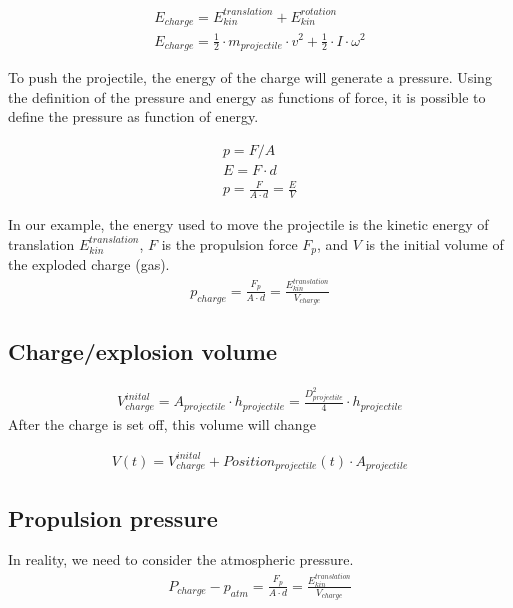 \documentclass[12pt,a4paper]{article}
\begin{document}
\begin{eqnarray}
	E_{charge} = E_{kin}^{translation} + E_{kin}^{rotation} \\
	E_{charge} = \frac{1}{2} \cdot m_{projectile} \cdot v^2 + \frac{1}{2} \cdot I \cdot \omega ^ 2
\end{eqnarray}

To push the projectile, the energy of the charge will generate a pressure. Using the definition of the pressure and energy as functions of force, it is possible to define the pressure as function of energy. 

\begin{eqnarray}
	p = F/A \\
	E = F \cdot d \\
	p = \frac{F}{A \cdot d} = \frac{E}{V}
\end{eqnarray}

In our example, the energy used to move the projectile is the kinetic energy of translation $E_{kin}^{translation}$, $F$ is the propulsion force $F_p$, and $V$ is the initial volume of the exploded charge (gas).
\begin{eqnarray}
	p_{charge} = \frac{F_p}{A \cdot d} = \frac{E_{kin}^{translation}}{V_{charge}}
\end{eqnarray}

\subsection{Charge/explosion volume}
\begin{eqnarray}
	V_{charge}^{inital} = A_{ projectile} \cdot h_{projectile} =  \frac{D_{projectile}^2}{4} \cdot h_{projectile}
\end{eqnarray}
After the charge is set off, this volume will change

\begin{eqnarray}
	V(t) = V_{charge}^{inital} + Position_{projectile}(t) \cdot A_{projectile}
\end{eqnarray}

\subsection{Propulsion pressure}

In reality, we need to consider the atmospheric pressure. 
\begin{eqnarray}
	P_{charge} - p_{atm} = \frac{F_p}{A \cdot d} = \frac{E_{kin}^{translation}}{V_{charge}}
\end{eqnarray}
\end{document}
